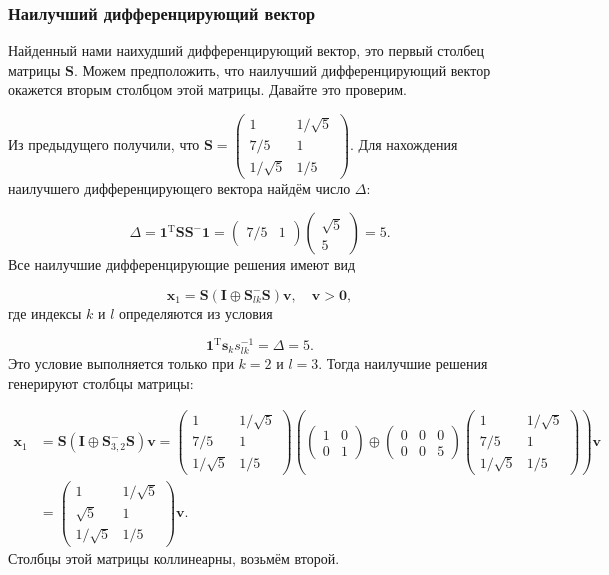 \documentclass[specialist,
	substylefile = spbu_report.rtx,
	subf,href,colorlinks=true, 12pt]{disser}
\begin{document}
\subsubsection{Наилучший дифференцирующий вектор}
\label{sec:org896b7a9}
Найденный нами наихудший дифференцирующий вектор, это первый столбец матрицы $\boldsymbol{S}$. Можем предположить, что наилучший дифференцирующий вектор окажется вторым столбцом этой матрицы. Давайте это проверим.

Из предыдущего получили, что \(\boldsymbol{S} = \begin{pmatrix}1&1/\sqrt{5}\\7/5&1\\1/\sqrt{5}&1/5\end{pmatrix}\).
Для нахождения наилучшего дифференцирующего вектора найдём число \(\Delta\):

\[
	\Delta = \mathbf{1}^\mathrm{T} \boldsymbol{S} \boldsymbol{S}^{-} \mathbf{1} = \begin{pmatrix}7/5&1\end{pmatrix}\begin{pmatrix}\sqrt{5}\\5\end{pmatrix} = 5.
\]
Все наилучшие дифференцирующие решения имеют вид

\[
	\boldsymbol{x}_{1}=\boldsymbol{S}\left(\boldsymbol{I} \oplus \boldsymbol{S}_{l k}^{-} \boldsymbol{S}\right) \boldsymbol{v}, \quad \boldsymbol{v}>\mathbf{0},
\]
где индексы \(k\) и \(l\) определяются из условия

\[
	\mathbf{1}^\mathrm{T} \boldsymbol{s}_{k} s_{l k}^{-1}=\Delta = 5.
\]
Это условие выполняется только при \(k=2\) и \(l=3\). Тогда наилучшие решения генерируют столбцы матрицы:

\begin{align*}
	\boldsymbol{x}_{1} & =\boldsymbol{S}\left(\boldsymbol{I} \oplus \boldsymbol{S}_{3,2}^{-} \boldsymbol{S}\right) \boldsymbol{v} = \begin{pmatrix}1&1/\sqrt{5}\\7/5&1\\1/\sqrt{5}&1/5\end{pmatrix} \left( \begin{pmatrix}1&0\\0&1\end{pmatrix} \oplus \begin{pmatrix}0&0&0\\0&0&5\end{pmatrix}\begin{pmatrix}1&  1/\sqrt{5}\\7/5&1\\1/\sqrt{5}&1/5\end{pmatrix} \right)\boldsymbol{v} \\
	                   & = \begin{pmatrix}1&1/\sqrt{5}\\\sqrt{5}&1\\1/\sqrt{5}&1/5\end{pmatrix}\boldsymbol{v}.
\end{align*}
Столбцы этой матрицы коллинеарны, возьмём второй.
\end{document}
